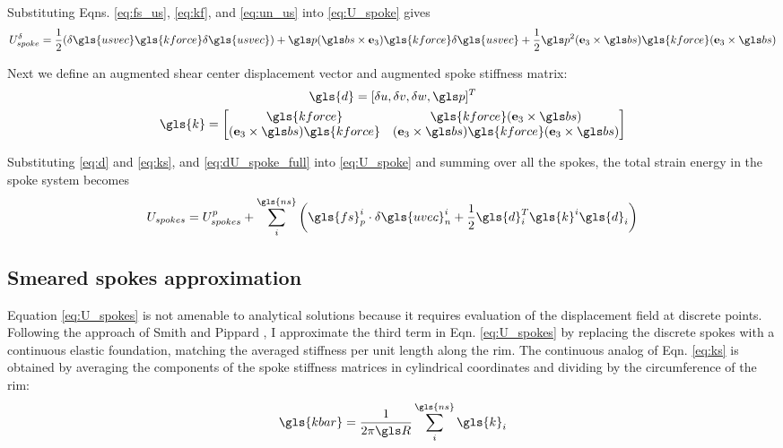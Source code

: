 \documentclass[\rootdir/thesis.tex]{subfiles}
\begin{document}
Substituting Eqns. \eqref{eq:fs_us}, \eqref{eq:kf}, and \eqref{eq:un_us} into \eqref{eq:U_spoke} gives
\begin{equation}
\label{eq:dU_spoke_full}
U_{spoke}^{\delta} = \frac{1}{2}(\delta\gls{usvec} \gls{kforce} \delta\gls{usvec}) +
    \p(\bs\times\eh)\gls{kforce}\delta\gls{usvec} +
    \frac{1}{2}\p^2(\eh\times\bs)\gls{kforce}(\eh\times\bs)
\end{equation}

Next we define an augmented shear center displacement vector and augmented spoke stiffness matrix:
\begin{gather}
\gls{d} = [\delta u, \delta v, \delta w, \p]^T\label{eq:d}\\
\gls{k} =
\begin{bmatrix}
\gls{kforce}                & \gls{kforce} (\eh\times\bs)\\
(\eh\times\bs) \gls{kforce} & (\eh\times\bs)\gls{kforce}(\eh\times\bs)
\end{bmatrix}\label{eq:ks}
\end{gather}

Substituting \eqref{eq:d} and \eqref{eq:ks}, and \eqref{eq:dU_spoke_full} into \eqref{eq:U_spoke} and summing over all the spokes, the total strain energy in the spoke system becomes
\begin{equation}
\label{eq:U_spokes}
U_{spokes} = U_{spokes}^p + \sum_i^{\gls{ns}} \left(\gls{fs}_p^i \cdot \delta\gls{uvec}_n^i +
    \frac{1}{2}\gls{d}_i^T \gls{k}^i \gls{d}_i\right)
\end{equation}

\subsection{Smeared spokes approximation}
\label{sec:smeared_spokes}
Equation \eqref{eq:U_spokes} is not amenable to analytical solutions because it requires evaluation of the displacement field at discrete points. Following the approach of Smith \cite{Smith1901} and Pippard \cite{Pippard1931}, I approximate the third term in Eqn. \eqref{eq:U_spokes} by replacing the discrete spokes with a continuous elastic foundation, matching the averaged stiffness per unit length along the rim. The continuous analog of Eqn. \eqref{eq:ks} is obtained by averaging the components of the spoke stiffness matrices in cylindrical coordinates and dividing by the circumference of the rim:
\begin{equation}
\label{eq:k_bar}
\gls{kbar} = \frac{1}{2\pi \R} \sum_i^{\gls{ns}} \gls{k}_i
\end{equation}
\end{document}
